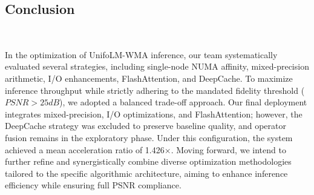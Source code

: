 \subsection{Conclusion}
\

In the optimization of UnifoLM-WMA inference, our team systematically evaluated several strategies, including single-node NUMA affinity, mixed-precision arithmetic, I/O enhancements, FlashAttention, and DeepCache. To maximize inference throughput while strictly adhering to the mandated fidelity threshold ($PSNR > 25 dB$), we adopted a balanced trade-off approach. Our final deployment integrates mixed-precision, I/O optimizations, and FlashAttention; however, the DeepCache strategy was excluded to preserve baseline quality, and operator fusion remains in the exploratory phase. Under this configuration, the system achieved a mean acceleration ratio of 1.426$\times$. Moving forward, we intend to further refine and synergistically combine diverse optimization methodologies tailored to the specific algorithmic architecture, aiming to enhance inference efficiency while ensuring full PSNR compliance.


\clearpage